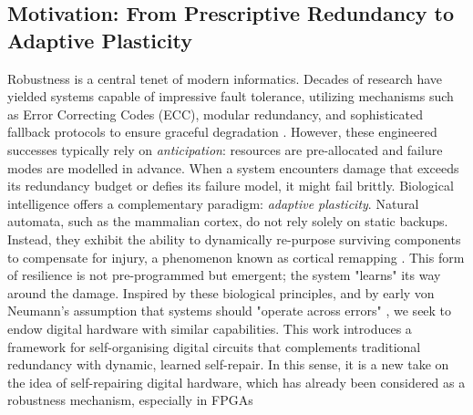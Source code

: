 \subsection*{Motivation: From Prescriptive Redundancy to Adaptive Plasticity}
Robustness is a central tenet of modern informatics. Decades of research have yielded systems capable of impressive fault tolerance, utilizing mechanisms such as Error Correcting Codes (ECC), modular redundancy, and sophisticated fallback protocols to ensure graceful degradation \citep{neumann_probabilistic_1956, schuster_robustness_2008}. However, these engineered successes typically rely on \textit{anticipation}: resources are pre-allocated and failure modes are modelled in advance. When a system encounters damage that exceeds its redundancy budget or defies its failure model, it might fail brittly.
Biological intelligence offers a complementary paradigm: \textit{adaptive plasticity}. Natural automata, such as the mammalian cortex, do not rely solely on static backups. Instead, they exhibit the ability to dynamically re-purpose surviving components to compensate for injury, a phenomenon known as cortical remapping \citep{nudo_recovery_2013}. This form of resilience is not pre-programmed but emergent; the system "learns" its way around the damage.
Inspired by these biological principles, and by early von Neumann's assumption that systems should "operate across errors" \citep{von_neumann_theory_1966}, we seek to endow digital hardware with similar capabilities. This work introduces a framework for self-organising digital circuits that complements traditional redundancy with dynamic, learned self-repair. 
In this sense, it is a new take on the idea of self-repairing digital hardware, which has already been considered as a robustness mechanism, especially in FPGAs \citep{carter_user_1986, schuster_robustness_2008, gokhale_dynamic_2004}


